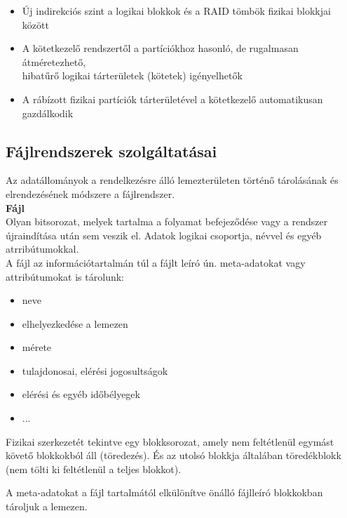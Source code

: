 \documentclass[tikz,12pt,margin=0px]{article}
\begin{document}
\begin{itemize}[topsep=8pt,itemsep=4pt,partopsep=4pt, parsep=4pt]
        \begin{itemize}
            \item Új indirekciós szint a logikai blokkok és a RAID tömbök fizikai blokkjai között
            \item A kötetkezelő rendszertől a partíciókhoz hasonló, de rugalmasan átméretezhető, \\
            hibatűrő logikai tárterületek (kötetek) igényelhetők
            \item A rábízott fizikai partíciók tárterületével a kötetkezelő automatikusan gazdálkodik
        \end{itemize}
    \end{itemize}
\newpage	
	\subsection*{Fájlrendszerek szolgáltatásai}
	
    \noindent Az adatállományok a rendelkezésre álló lemezterületen történő tárolásának és elrendezésének módszere a fájlrendszer.\\

    \noindent \textbf{Fájl}\\

    \noindent Olyan bitsorozat, melyek tartalma a folyamat befejeződése vagy a rendszer újraindítása után sem veszik el. Adatok logikai csoportja, névvel és egyéb atrribútumokkal.\\
    
    \noindent A fájl az információtartalmán túl a fájlt leíró ún. meta-adatokat vagy attribútumokat is tárolunk:
    \begin{itemize}[topsep=8pt,itemsep=4pt,partopsep=4pt, parsep=4pt]
      \item neve
      \item elhelyezkedése a lemezen
      \item mérete
      \item tulajdonosai, elérési jogosultságok
      \item elérési és egyéb időbélyegek
      \item $\ldots$
    \end{itemize}

    \noindent Fizikai szerkezetét tekintve egy blokksorozat, amely nem feltétlenül egymást követő blokkokból áll (töredezés). És az utolsó blokkja általában töredékblokk (nem tölti ki feltétlenül a teljes blokkot).

    \noindent A meta-adatokat a fájl tartalmától elkülönítve önálló fájlleíró blokkokban tároljuk a lemezen.\\
\end{document}
